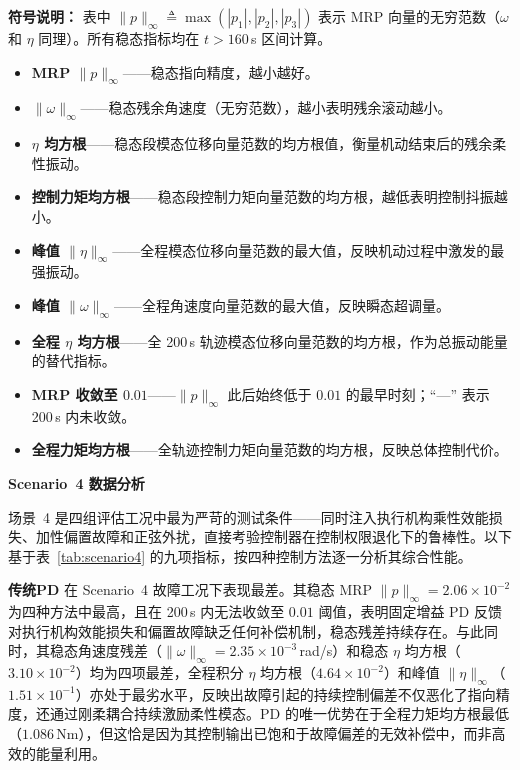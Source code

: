 \noindent\textbf{符号说明：} 表中 $\|p\|_\infty \triangleq \max(|p_1|,|p_2|,|p_3|)$ 表示 MRP 向量的无穷范数（$\omega$ 和 $\eta$ 同理）。所有稳态指标均在 $t > 160$\,s 区间计算。
\begin{itemize}[leftmargin=*, itemsep=0pt, topsep=4pt]
\item \textbf{MRP $\|p\|_\infty$}——稳态指向精度，越小越好。
\item \textbf{$\|\omega\|_\infty$}——稳态残余角速度（无穷范数），越小表明残余滚动越小。
\item \textbf{$\eta$ 均方根}——稳态段模态位移向量范数的均方根值，衡量机动结束后的残余柔性振动。
\item \textbf{控制力矩均方根}——稳态段控制力矩向量范数的均方根，越低表明控制抖振越小。
\item \textbf{峰值 $\|\eta\|_\infty$}——全程模态位移向量范数的最大值，反映机动过程中激发的最强振动。
\item \textbf{峰值 $\|\omega\|_\infty$}——全程角速度向量范数的最大值，反映瞬态超调量。
\item \textbf{全程 $\eta$ 均方根}——全 200\,s 轨迹模态位移向量范数的均方根，作为总振动能量的替代指标。
\item \textbf{MRP 收敛至 $0.01$}——$\|p\|_\infty$ 此后始终低于 $0.01$ 的最早时刻；``---'' 表示 200\,s 内未收敛。
\item \textbf{全程力矩均方根}——全轨迹控制力矩向量范数的均方根，反映总体控制代价。
\end{itemize}

\vspace{6pt}
\noindent\textbf{Scenario~4 数据分析}

场景~4 是四组评估工况中最为严苛的测试条件——同时注入执行机构乘性效能损失、加性偏置故障和正弦外扰，直接考验控制器在控制权限退化下的鲁棒性。以下基于表~\ref{tab:scenario4} 的九项指标，按四种控制方法逐一分析其综合性能。

\textbf{传统PD} 在 Scenario~4 故障工况下表现最差。其稳态 MRP $\|p\|_\infty = 2.06\times10^{-2}$ 为四种方法中最高，且在 200\,s 内无法收敛至 $0.01$ 阈值，表明固定增益 PD 反馈对执行机构效能损失和偏置故障缺乏任何补偿机制，稳态残差持续存在。与此同时，其稳态角速度残差（$\|\omega\|_\infty = 2.35\times10^{-3}$\,rad/s）和稳态 $\eta$ 均方根（$3.10\times10^{-2}$）均为四项最差，全程积分 $\eta$ 均方根（$4.64\times10^{-2}$）和峰值 $\|\eta\|_\infty$（$1.51\times10^{-1}$）亦处于最劣水平，反映出故障引起的持续控制偏差不仅恶化了指向精度，还通过刚柔耦合持续激励柔性模态。PD 的唯一优势在于全程力矩均方根最低（$1.086$\,Nm），但这恰是因为其控制输出已饱和于故障偏差的无效补偿中，而非高效的能量利用。

